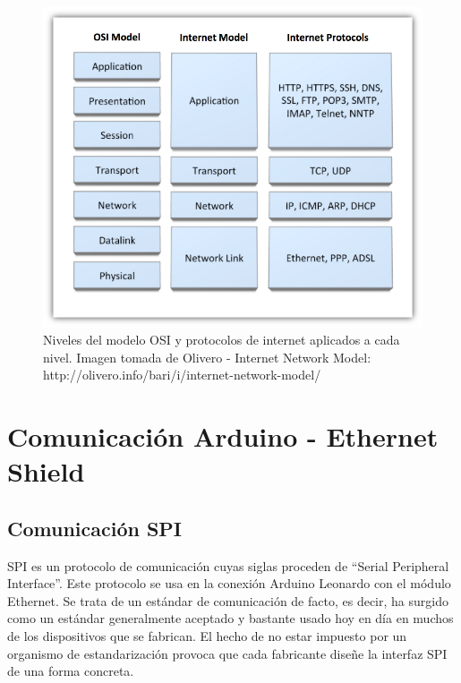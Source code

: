 \begin{figure}
\centering
\includegraphics[scale = 0.9]{capitulo_02/figuras_dir/OSI.jpg}
\caption{Niveles del modelo OSI y protocolos de internet aplicados a cada nivel. Imagen tomada de Olivero - Internet Network Model: http://olivero.info/bari/i/internet-network-model/}
\label{fig: OSI}
\end{figure}







\clearpage

\section{Comunicación Arduino - Ethernet Shield} %

\subsection{Comunicación SPI} %

SPI es un protocolo de comunicación cuyas siglas proceden de ``Serial Peripheral Interface''. Este protocolo se usa en la conexión Arduino Leonardo con el módulo Ethernet. Se trata de un estándar de comunicación de facto, es decir, ha surgido como un estándar generalmente aceptado y bastante usado hoy en día en muchos de los dispositivos que se fabrican. El hecho de no estar impuesto por un organismo de estandarización provoca que cada fabricante diseñe la interfaz SPI de una forma concreta.

